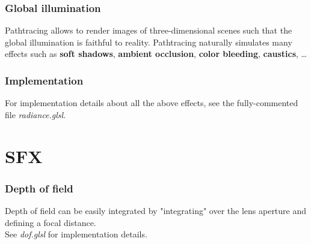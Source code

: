 \documentclass[a4paper,10pt]{article}
\begin{document}
\subsubsection{Global illumination}

Pathtracing allows to render images of three-dimensional scenes such that the global illumination is faithful to reality. Pathtracing naturally simulates many effects such as \textbf{soft shadows}, \textbf{ambient occlusion}, \textbf{color bleeding}, \textbf{caustics}, \ldots

\subsubsection{Implementation}
For implementation details about all the above effects, see the fully-commented file \textit{radiance.glsl}.

\section{SFX}

\subsubsection{Depth of field}

Depth of field can be easily integrated by "integrating" over the lens aperture and defining a focal distance. \\
See \textit{dof.glsl} for implementation details.\\
\end{document}
